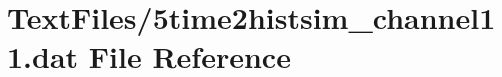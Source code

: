 \hypertarget{5time2histsim__channel11_8dat}{}\section{Text\+Files/5time2histsim\+\_\+channel11.dat File Reference}
\label{5time2histsim__channel11_8dat}
